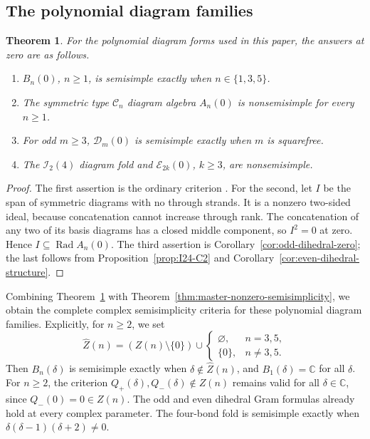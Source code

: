\documentclass[11pt,a4paper]{amsart}
\newtheorem{theorem}{Theorem}[section]
\theoremstyle{uprightdefinition}
\theoremstyle{remark}\newtheorem{remark}[theorem]{Remark}
\begin{document}
\subsection{The polynomial diagram families}
\begin{theorem}\label{thm:master-zero-semisimplicity}
For the polynomial diagram forms used in this paper, the answers at
zero are as follows.
\begin{enumerate}
\item $B_n(0)$, $n\ge1$, is semisimple exactly when $n\in\{1,3,5\}$.
\item The symmetric type $\mathscr{C}_n$ diagram algebra $A_n(0)$ is nonsemisimple
for every $n\ge1$.
\item For odd $m\ge3$, $\mathcal D_m(0)$ is semisimple exactly when
$m$ is squarefree.
\item The $\mathscr{I}_2(4)$ diagram fold and $\mathcal E_{2k}(0)$, $k\ge3$,
are nonsemisimple.
\end{enumerate}
\end{theorem}
\begin{proof}
The first assertion is the ordinary criterion
\cite{Rui2005,RuiSi2006}. For the second, let $I$ be the span of
symmetric diagrams with no through strands. It is a nonzero two-sided
ideal, because concatenation cannot increase through rank. The
concatenation of any two of its basis diagrams has a closed middle
component, so $I^2=0$ at zero. Hence $I\subseteq\operatorname{Rad}A_n(0)$.
The third assertion is Corollary~\ref{cor:odd-dihedral-zero}; the last
follows from Proposition~\ref{prop:I24-C2} and
Corollary~\ref{cor:even-dihedral-structure}.
\end{proof}

Combining Theorem~\ref{thm:master-zero-semisimplicity} with Theorem~\ref{thm:master-nonzero-semisimplicity}, we obtain the complete complex
semisimplicity criteria for these polynomial diagram families. Explicitly, for $n\ge2$, we set
\[
 \widehat Z(n)=(Z(n)\setminus\{0\})\cup
 \begin{cases}\varnothing,&n=3,5,\\\{0\},&n\ne3,5.\end{cases}
\]
Then $B_n(\delta)$ is semisimple exactly when
$\delta\notin\widehat Z(n)$, and $B_1(\delta)=\mathbb C$ for all
$\delta$. For $n\ge2$, the criterion
$Q_+(\delta),Q_-(\delta)\notin Z(n)$ remains valid for all
$\delta\in\mathbb C$, since $Q_-(0)=0\in Z(n)$.
The odd and even dihedral Gram formulas already hold at every
complex parameter. The four-bond fold is semisimple exactly when
$\delta(\delta-1)(\delta+2)\ne0$.
\end{document}
